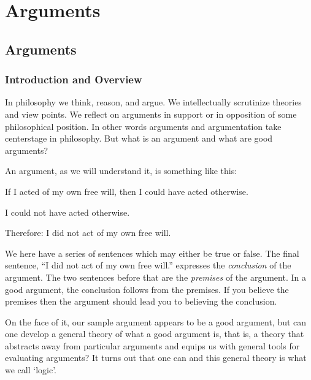 \part{Arguments}
\label{ch:intro}


\chapter{Arguments}
\label{sec:Arguments}
\section{Introduction and Overview}
In philosophy we think, reason, and argue. We intellectually scrutinize theories and view points. We reflect on arguments in support or in opposition of some philosophical position. In other words arguments and argumentation take centerstage in philosophy. But what is an argument and what are good arguments? 

An argument, as we will understand it, is something like this:
		\begin{ebullet}
	\item If I acted of my own free will, then I could have acted otherwise.
	\item I could not have acted otherwise.
	\item Therefore: I did not act of my own free will.
		\end{ebullet}
We here have a series of sentences which may either be true or false. The final sentence, ``I did not act of my own free will.'' expresses the \emph{conclusion} of the argument. The two sentences before that are the \emph{premises} of the argument. In a good argument, the conclusion follows from the premises. If you believe the premises then the argument should lead you to believing the conclusion.

On the face of it, our sample argument appears to be a good argument, but can one develop a general theory of what a good argument is, that is, a theory that abstracts away from particular arguments and equips us with general tools for evaluating arguments? It turns out that one can and this general theory is what we call `logic'.

